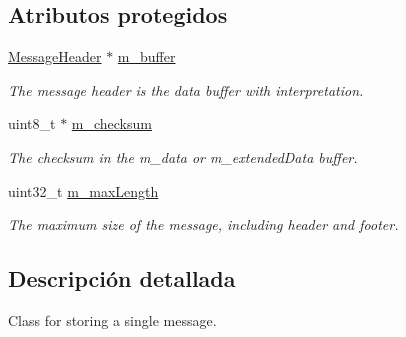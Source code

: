 \subsection*{\-Atributos protegidos}
\begin{DoxyCompactItemize}
\item 
\hypertarget{classxsens_1_1Message_a4932cf070ef6eabfc4c3415f3ec9ebc5}{\hyperlink{structxsens_1_1MessageHeader}{\-Message\-Header} $\ast$ \hyperlink{classxsens_1_1Message_a4932cf070ef6eabfc4c3415f3ec9ebc5}{m\-\_\-buffer}}\label{classxsens_1_1Message_a4932cf070ef6eabfc4c3415f3ec9ebc5}

\begin{DoxyCompactList}\small\item\em \-The message header is the data buffer with interpretation. \end{DoxyCompactList}\item 
\hypertarget{classxsens_1_1Message_a8aea3092d5e3d5ae98abd47616f6dda7}{uint8\-\_\-t $\ast$ \hyperlink{classxsens_1_1Message_a8aea3092d5e3d5ae98abd47616f6dda7}{m\-\_\-checksum}}\label{classxsens_1_1Message_a8aea3092d5e3d5ae98abd47616f6dda7}

\begin{DoxyCompactList}\small\item\em \-The checksum in the m\-\_\-data or m\-\_\-extended\-Data buffer. \end{DoxyCompactList}\item 
\hypertarget{classxsens_1_1Message_a9d62bb2e040cf62f8eef7cb66088adcc}{uint32\-\_\-t \hyperlink{classxsens_1_1Message_a9d62bb2e040cf62f8eef7cb66088adcc}{m\-\_\-max\-Length}}\label{classxsens_1_1Message_a9d62bb2e040cf62f8eef7cb66088adcc}

\begin{DoxyCompactList}\small\item\em \-The maximum size of the message, including header and footer. \end{DoxyCompactList}\end{DoxyCompactItemize}


\subsection{\-Descripción detallada}
\-Class for storing a single message. 

